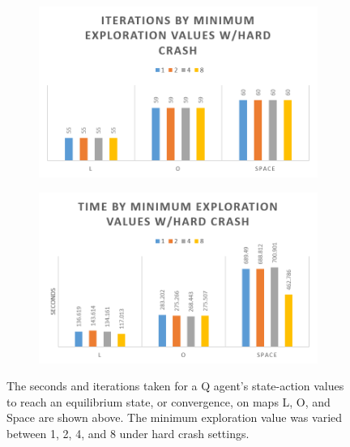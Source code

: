 \documentclass[12pt, letter]{article}
\begin{document}
\begin{figure}[h] 
    \centering
    \begin{subfigure}[b]{0.48\textwidth}
        \includegraphics[width=1\textwidth]{img/hard_Iter}
    \end{subfigure}
    \begin{subfigure}[b]{0.48\textwidth}
        \includegraphics[width=1\textwidth]{img/hard_Time}
    \end{subfigure}
    \caption{The seconds and iterations taken for a Q agent's state-action values to reach an equilibrium state, or convergence, on maps L, O, and Space are shown above. The minimum exploration value was varied between 1, 2, 4, and 8 under hard crash settings.}
    \label{fig:hardTimeIter}
\end{figure}
\end{document}
